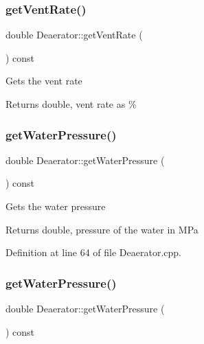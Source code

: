 \subsubsection{\texorpdfstring{get\+Vent\+Rate()}{getVentRate()}\hspace{0.1cm}{\footnotesize\ttfamily [3/3]}}
{\footnotesize\ttfamily double Deaerator\+::get\+Vent\+Rate (\begin{DoxyParamCaption}{ }\end{DoxyParamCaption}) const}

Gets the vent rate \begin{DoxyReturn}{Returns}
double, vent rate as \% 
\end{DoxyReturn}
\mbox{\label{class_deaerator_ae86ef305a8641d61ec76bd39bb84f28b}} 
\subsubsection{\texorpdfstring{get\+Water\+Pressure()}{getWaterPressure()}\hspace{0.1cm}{\footnotesize\ttfamily [1/3]}}
{\footnotesize\ttfamily double Deaerator\+::get\+Water\+Pressure (\begin{DoxyParamCaption}{ }\end{DoxyParamCaption}) const}

Gets the water pressure \begin{DoxyReturn}{Returns}
double, pressure of the water in M\+Pa 
\end{DoxyReturn}


Definition at line 64 of file Deaerator.\+cpp.

\mbox{\label{class_deaerator_ae86ef305a8641d61ec76bd39bb84f28b}} 
\subsubsection{\texorpdfstring{get\+Water\+Pressure()}{getWaterPressure()}\hspace{0.1cm}{\footnotesize\ttfamily [2/3]}}
{\footnotesize\ttfamily double Deaerator\+::get\+Water\+Pressure (\begin{DoxyParamCaption}{ }\end{DoxyParamCaption}) const}

